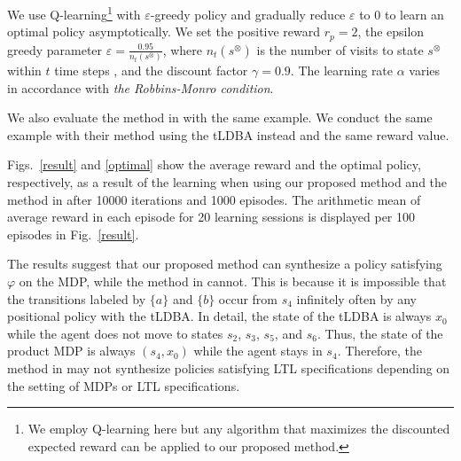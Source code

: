 \documentclass[letterpaper, 10 pt, conference]{ieeeconf}  %
\begin{document}
We use Q-learning\footnote{We employ Q-learning here but any algorithm that maximizes the discounted expected reward can be applied to our proposed method.} with $\varepsilon$-greedy policy and gradually reduce $\varepsilon$ to 0 to learn an optimal policy asymptotically.
We set the positive reward $r_p = 2$, the epsilon greedy parameter $ \varepsilon = \frac{0.95}{n_t(s^{\otimes})}$, where $n_t(s^{\otimes})$ is the number of visits to state $s^{\otimes}$ within $t$ time steps \cite{Singh1998}, and the discount factor $\gamma = 0.9$. The learning rate $\alpha$ varies in accordance with {\it the Robbins-Monro condition}.

We also evaluate the method in \cite{HAK2019} with the same example.
We conduct the same example with their method using the tLDBA instead and the same reward value.

Figs.\ \ref{result} and \ref{optimal} show the average reward and the optimal policy, respectively, as a result of the learning when using our proposed method and the method in \cite{HAK2019} after 10000 iterations and 1000 episodes. The arithmetic mean of average reward in each episode for 20 learning sessions is displayed per 100 episodes in Fig.\ \ref{result}.

The results suggest that our proposed method can synthesize a policy satisfying $\varphi$ on the MDP, while the method in \cite{HAK2019} cannot. This is because it is impossible that the transitions labeled by $\{ a \}$ and $\{ b \}$ occur from $s_4$ infinitely often by any positional policy with the tLDBA. In detail, the state of the tLDBA is always $x_0$ while the agent does not move to states $s_2$, $s_3$, $s_5$, and $s_6$. Thus, the state of the product MDP is always $(s_4, x_0)$ while the agent stays in $s_4$. Therefore, the method in \cite{HAK2019} may not synthesize policies satisfying LTL specifications depending on the setting of MDPs or LTL specifications.
\end{document}
